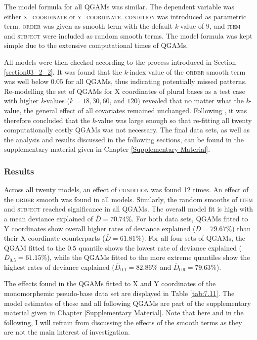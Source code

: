 The model formula for all QGAMs was similar. The dependent variable was either \textsc{x\_coordinate} or \textsc{y\_coordinate}. \textsc{condition} was introduced as parametric term. \textsc{order} was given as smooth term with the default \textit{k}-value of $9$, and \textsc{item} and \textsc{subject} were included as random smooth terms. The model formula was kept simple due to the extensive computational times of QGAMs. 

All models were then checked according to the process introduced in Section \ref{section03_2_2}. It was found that the \textit{k}-index value of the \textsc{order} smooth term was well below $0.05$ for all QGAMs, thus indicating potentially missed patterns. Re-modelling the set of QGAMs for X coordinates of plural bases as a test case with higher \textit{k}-values ($k=18,30,60$, and $120$) revealed that no matter what the \textit{k}-value, the general effect of all covariates remained unchanged. Following \citet{Wood2017}, it was therefore concluded that the \textit{k}-value was large enough so that re-fitting all twenty computationally costly QGAMs was not necessary. The final data sets, as well as the analysis and results discussed in the following sections, can be found in the supplementary material given in Chapter \ref{Supplementary Material}.

\subsubsection{Results}\label{section07_2_3_2}

Across all twenty models, an effect of \textsc{condition} was found 12 times. An effect of the \textsc{order} smooth was found in all models. Similarly, the random smooths of \textsc{item} and \textsc{subject} reached significance in all QGAMs. The overall model fit is high with a mean deviance explained of $\overline{D}=70.74$\%. For both data sets, QGAMs fitted to Y coordinates show overall higher rates of deviance explained ($\overline{D}=79.67$\%) than their X coordinate counterparts ($\overline{D}=61.81$\%). For all four sets of QGAMs, the QGAM fitted to the $0.5$ quantile shows the lowest rate of deviance explained ($\overline{D}_{0.5}=61.15$\%), while the QGAMs fitted to the more extreme quantiles show the highest rates of deviance explained ($\overline{D}_{0.1}=82.86$\% and $\overline{D}_{0.9}=79.63$\%).

The effects found in the QGAMs fitted to X and Y coordinates of the monomorphemic pseudo-base data set are displayed in Table \ref{tab:7.11}. The model estimates of these and all following QGAMs are part of the supplementary material given in Chapter \ref{Supplementary Material}. Note that here and in the following, I will refrain from discussing the effects of the smooth terms as they are not the main interest of investigation. 

